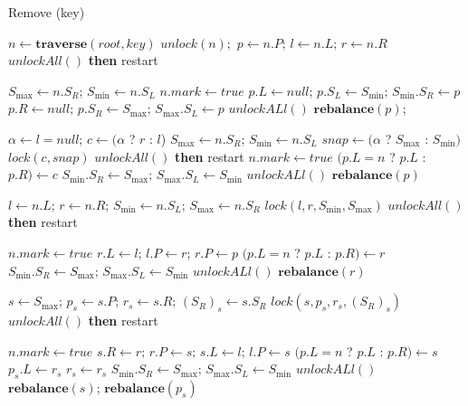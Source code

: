 \documentclass[conference]{IEEEtran}
\theoremstyle{definition}
\theoremstyle{theorem}
\renewcommand{\O}{\,||\,}
\newcommand{\A}{\,\&\&\,}
\begin{document}
\begin{algorithm}[th]
\caption{Remove (key)}
\label{alg:remove}
\begin{algorithmic}[1]
\State $n\gets \mathbf{traverse}(root, key)$
 $unlock(n);$ \Return
\EndIf
\State $p \gets n.P;\,l\gets n.L;\, r\gets n.R$
 $unlockAll()$ \textbf{then} restart
\EndIf

	\State $S_{\max} \gets n.S_R;\, S_{\min} \gets n.S_L$
	\State $n.mark\gets true$
	\label{alg:remove:leaf}
		\State $p.L \gets null;\,p.S_L \gets S_{\min};\, S_{\min}.S_R \gets p$
	\Else
		\State $p.R \gets null;\,p.S_R \gets S_{\max};\, S_{\max}.S_L \gets p$
	\EndIf
	\State $unlockALl()$
	 $\mathbf{rebalance}(p)$; \Return
	\EndIf 
\EndIf

	\State $\alpha \gets l=null;\, c\gets (\alpha$ ? $r$ : $l$)
	\State $S_{\max} \gets n.S_R;\,S_{\min} \gets n.S_L$
	\State $snap \gets (\alpha$ ? $S_{\max}$ : $S_{\min})$
	\State $lock(c, snap)$
	\If {($\alpha \A snap.S_L \neq n) \O (!\alpha \A snap.S_R \neq n$)}
		\State $unlockAll()$ \textbf{then} restart
	\EndIf
	\State $n.mark\gets true$
	\State $(p.L = n$ ? $p.L$ : $p.R) \gets c$
	\State $S_{\min}.S_R \gets S_{\max};\,S_{\max}.S_L \gets S_{\min}$ \label{alg:remove:child}
	\State $unlockALl()$
	 $\mathbf{rebalance}(p)$
	\EndIf
	\Return
\EndIf

\State $l \gets n.L;\,r\gets n.R;\,S_{\min} \gets n.S_L;\,S_{\max} \gets n.S_R$
\State $lock(l, r, S_{\min}, S_{\max})$
	\State $unlockAll()$ \textbf{then} restart
\EndIf

	\State $n.mark \gets true$
	\State $r.L \gets l;\,l.P \gets r;\,r.P\gets p$
	\State $(p.L=n $ ? $p.L$ : $p.R) \gets r$
	\State $S_{\min}.S_R \gets S_{\max};\,S_{\max}.S_L \gets S_{\min}$
	\State $unlockALl()$
	 $\mathbf{rebalance}(r)$
	\EndIf
	\Return
\EndIf

\State $s\gets S_{\max};\,p_s \gets s.P; \,r_s \gets s.R;\,({S_R})_s \gets s.S_R$
\State $lock(s, p_s, r_s, ({S_R})_s)$
	\State $unlockAll()$ \textbf{then} restart
\EndIf

\State $n.mark\gets true$
\State $s.R\gets r;\, r.P \gets s;\, s.L\gets l;\, l.P \gets s$
\State $(p.L=n $ ? $p.L$ : $p.R) \gets s$
\State $p_s.L\gets r_s$
 $r_s\gets r_s$
\EndIf
\State $S_{\min}.S_R \gets S_{\max};\,S_{\max}.S_L \gets S_{\min}$ \label{alg:remove:hard:snap}
\State $unlockALl()$
\State $\mathbf{rebalance}(s);\,\mathbf{rebalance}(p_s)$
\EndIf
\end{algorithmic}
\end{algorithm}
\end{document}

